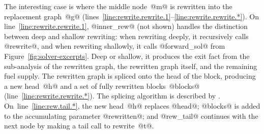 \documentclass[blockstyle,preprint,natbib,nocopyrightspace]{sigplanconf}
\newcommand\lineref[1]{line~\ref{line:#1}}
\newcommand\linerangeref[2]{\mbox{lines~\ref{line:#1}--\ref{line:#2}}}
\newcommand\figref[1]{Figure~\ref{fig:#1}}
\begin{document}
The interesting case is where the middle node~@m@ is rewritten into
the replacement graph~@g@ (\linerangeref{rewrite.rewrite.1}{rewrite.rewrite.*}).
On \lineref{rewrite.rewrite.1}, @inner_rew@ (not shown) handles the
distinction between deep and shallow rewriting:
when rewriting deeply, it recursively calls @rewrite@,
and 
when rewriting shallowly, it calls @forward_sol@ from
\figref{solver-excerpts}. 
Deep or shallow, it produces the exit fact from the sub-analysis of
the rewritten graph, 
the rewritten graph itself, 
and the remaining fuel supply.
The rewritten graph is
spliced onto the head of the block, producing a new head~@h@ and a set
of fully rewritten blocks~@blocks@ (\lineref{rewrite.rewrite.*}).
The splicing algorithm is described by
\citet{ramsey-dias:applicative-control-flow}. 
On~\lineref{rew.tail.*}, 
the new head~@h@ replaces @head@; @blocks@ is added to the
accumulating parameter @rewritten@; and
@rew_tail@ continues with the next node by making a tail call
to rewrite~@t@.
\end{document}
